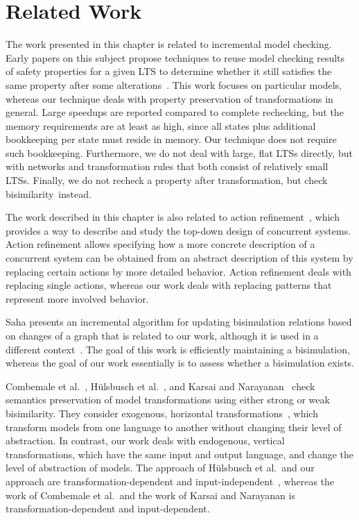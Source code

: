 \section{Related Work}
\label{sec:lts-transformation:related}


The work presented in this chapter is related to incremental model checking.
Early papers on this subject propose techniques to reuse model checking results of safety properties for a given LTS to determine whether it still satisfies the same property after some alterations~\cite{sokolsky.smolka.inc,swamy}.
This work focuses on particular models, whereas our technique deals with property preservation of transformations in general.
Large speedups are reported compared to complete rechecking, but the memory requirements are at least as high, since all states plus additional bookkeeping per state must reside in memory.
Our technique does not require such bookkeeping.
Furthermore, we do not deal with large, flat LTSs directly, but with networks and transformation rules that both consist of relatively small LTSs.
Finally, we do not recheck a property after transformation, but check bisimilarity~instead.

The work described in this chapter is also related to action refinement~\cite{GoRe01}, which provides a way to describe and study the top-down design of concurrent systems.
Action refinement allows specifying how a more concrete description of a concurrent system can be obtained from an abstract description of this system by replacing certain actions by more detailed behavior.
Action refinement deals with replacing single actions, whereas our work deals with replacing patterns that represent more involved behavior.

Saha presents an incremental algorithm for updating bisimulation relations based on changes of a graph that is related to our work, although it is used in a different context~\cite{saha.bisimulation}.
The goal of this work is efficiently maintaining a bisimulation, whereas the goal of our work essentially is to assess whether a bisimulation exists.

Combemale et al.~\cite{combemale.mde}, H{\"u}lsbusch et al.~\cite{Rensink2010}, and Karsai and Narayanan~\cite{narayanan.karsai.towardsverifyingmt,Karsai:2006:CMT:1785644.1785646} check semantics preservation of model transformations using either strong or weak bisimilarity.
They consider exogenous, horizontal transformations~\cite{Mens:2006:TMT:1706639.1706924}, which transform models from one language to another without changing their level of abstraction.
In contrast, our work deals with endogenous, vertical transformations, which have the same input and output language, and change the level of abstraction of models.
The approach of H{\"u}lsbusch et al.\ and our approach are transformation-dependent and input-independent~\cite{amrani.overview}, whereas the work of Combemale et al.\ and the work of Karsai and Narayanan is transformation-dependent and input-dependent.

